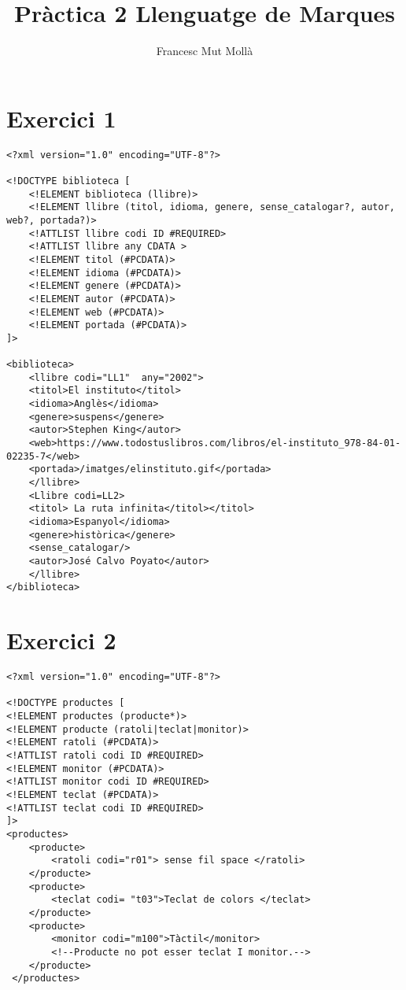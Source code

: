 \documentclass{article}
\title{Pràctica 2 Llenguatge de Marques}
\author{Francesc Mut Mollà}
\begin{document}
\maketitle
\newpage
\section{Exercici 1}

\begin{verbatim}
<?xml version="1.0" encoding="UTF-8"?>

<!DOCTYPE biblioteca [
    <!ELEMENT biblioteca (llibre)>
    <!ELEMENT llibre (titol, idioma, genere, sense_catalogar?, autor, web?, portada?)>
    <!ATTLIST llibre codi ID #REQUIRED>
    <!ATTLIST llibre any CDATA >
    <!ELEMENT titol (#PCDATA)>
    <!ELEMENT idioma (#PCDATA)>
    <!ELEMENT genere (#PCDATA)>
    <!ELEMENT autor (#PCDATA)>
    <!ELEMENT web (#PCDATA)>
    <!ELEMENT portada (#PCDATA)>
]>

<biblioteca> 
    <llibre codi="LL1"  any="2002"> 
    <titol>El instituto</titol> 
    <idioma>Anglès</idioma> 
    <genere>suspens</genere> 
    <autor>Stephen King</autor> 
    <web>https://www.todostuslibros.com/libros/el-instituto_978-84-01-02235-7</web> 
    <portada>/imatges/elinstituto.gif</portada> 
    </llibre>
    <Llibre codi=LL2> 
    <titol> La ruta infinita</titol></titol> 
    <idioma>Espanyol</idioma> 
    <genere>històrica</genere> 
    <sense_catalogar/> 
    <autor>José Calvo Poyato</autor>
    </llibre> 
</biblioteca>

\end{verbatim}
\newpage


\section{Exercici 2}

\begin{verbatim}
<?xml version="1.0" encoding="UTF-8"?>

<!DOCTYPE productes [
<!ELEMENT productes (producte*)>
<!ELEMENT producte (ratoli|teclat|monitor)>
<!ELEMENT ratoli (#PCDATA)>
<!ATTLIST ratoli codi ID #REQUIRED>
<!ELEMENT monitor (#PCDATA)>
<!ATTLIST monitor codi ID #REQUIRED>
<!ELEMENT teclat (#PCDATA)>
<!ATTLIST teclat codi ID #REQUIRED>
]>
<productes>
    <producte>
        <ratoli codi="r01"> sense fil space </ratoli>
    </producte>
    <producte>
        <teclat codi= "t03">Teclat de colors </teclat>
    </producte>
    <producte>
        <monitor codi="m100">Tàctil</monitor>
        <!--Producte no pot esser teclat I monitor.-->
    </producte>
 </productes>
\end{verbatim}
\newpage
\end{document}
